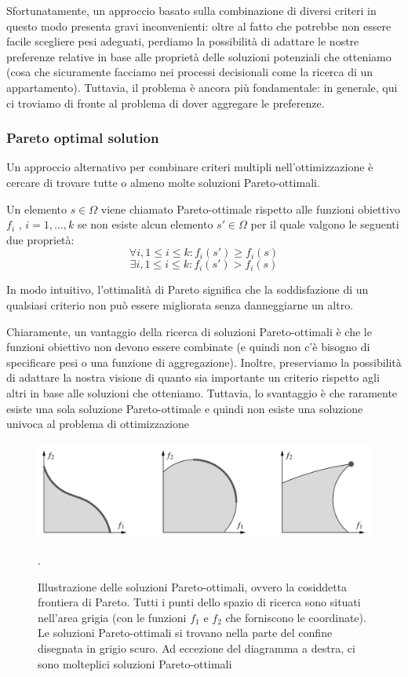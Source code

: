 Sfortunatamente, un approccio basato sulla combinazione di diversi criteri in questo modo presenta gravi inconvenienti: oltre al fatto che potrebbe non essere facile scegliere pesi adeguati, perdiamo la possibilità di adattare le nostre preferenze relative in base alle proprietà delle soluzioni potenziali che otteniamo (cosa che sicuramente facciamo nei processi decisionali come la ricerca di un appartamento). Tuttavia, il problema è ancora più fondamentale: in generale, qui ci troviamo di fronte al problema di dover aggregare le preferenze.

\subsubsection{Pareto optimal solution}
Un approccio alternativo per combinare criteri multipli nell'ottimizzazione è cercare di trovare tutte o almeno molte soluzioni Pareto-ottimali.
\begin{definizione}
    Un elemento $s \in \Omega$ viene chiamato Pareto-ottimale rispetto alle funzioni obiettivo $f_i$ , $i = 1, \dots , k$ se non esiste alcun elemento $s\prime \in \Omega$ per il quale valgono le seguenti due proprietà:
    $$\forall i, 1\leq i \leq k: f_i(s\prime) \geq f_i(s)$$
    $$\exists i, 1 \leq i \leq k: f_i(s\prime) > f_i(s)$$
\end{definizione}
In modo intuitivo, l'ottimalità di Pareto significa che la soddisfazione di un qualsiasi criterio non può essere migliorata senza danneggiarne un altro.

Chiaramente, un vantaggio della ricerca di soluzioni Pareto-ottimali è che le funzioni obiettivo non devono essere combinate (e quindi non c'è bisogno di specificare pesi o una funzione di aggregazione). Inoltre, preserviamo la possibilità di adattare la nostra visione di quanto sia importante un criterio rispetto agli altri in base alle soluzioni che otteniamo. Tuttavia, lo svantaggio è che raramente esiste una sola soluzione Pareto-ottimale e quindi non esiste una soluzione univoca al problema di ottimizzazione

\begin{figure}[h]
    \centering
    \includegraphics[scale=0.40]{images/pareto.png}
    \caption{Illustrazione delle soluzioni Pareto-ottimali, ovvero la cosiddetta frontiera di Pareto. Tutti i punti dello spazio di ricerca sono situati nell'area grigia (con le funzioni $f_1$ e $f_2$ che forniscono le coordinate). Le soluzioni Pareto-ottimali si trovano nella parte del confine disegnata in grigio scuro. Ad eccezione del diagramma a destra, ci sono molteplici soluzioni Pareto-ottimali}.
\end{figure}

